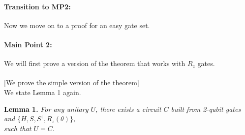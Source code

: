\documentclass[11pt]{article}
\begin{document}
\paragraph{Transition to MP2:}
Now we move on to a proof for an easy gate set.

\newpage

\paragraph{Main Point 2:}
We will first prove a version of the theorem that works with $R_z$ gates. \\
\mbox{} \\ \hspace*{1cm}
   [We prove the simple version of the theorem] \\
We state Lemma 1 again.

\bigskip

\noindent
{\bf Lemma 1.} 
{\em 
For any unitary $U$,
there exists a circuit $C$ built from 
2-qubit gates and
$\{H, S, S^\dagger, R_z(\theta)\}$, \\
such that $U = C$.}
\end{document}
